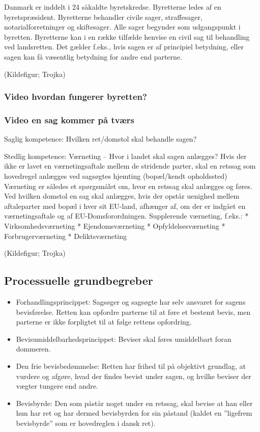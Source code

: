 \documentclass[]{book}
\providecommand{\tightlist}{%
  \setlength{\itemsep}{0pt}\setlength{\parskip}{0pt}}
\begin{document}
Danmark er inddelt i 24 såkaldte byretskredse.
Byretterne ledes af en byretspræsident.
Byretterne behandler civile sager, straffesager, notarialforretninger og skiftesager.
Alle sager begynder som udgangspunkt i byretten.
Byretterne kan i en række tilfælde henvise en civil sag til behandling ved landsretten. Det gælder f.eks., hvis sagen er af principiel betydning, eller sagen kan få væsentlig betydning for andre end parterne.

(Kildefigur; Trojka)

\hypertarget{video-hvordan-fungerer-byretten}{%
\subsubsection{Video hvordan fungerer byretten?}\label{video-hvordan-fungerer-byretten}}

\hypertarget{video-en-sag-kommer-pa-tvrs}{%
\subsubsection{Video en sag kommer på tværs}\label{video-en-sag-kommer-pa-tvrs}}

Saglig kompetence: Hvilken ret/domstol skal behandle sagen?

Stedlig kompetence: Værneting -- Hvor i landet skal sagen anlægges?
Hvis der ikke er lavet en værnetingsaftale mellem de stridende parter, skal en retssag som hovedregel anlægges ved sagsøgtes hjemting (bopæl/kendt opholdssted) Værneting er således et spørgsmålet om, hvor en retssag skal anlægges og føres. Ved hvilken domstol en sag skal anlægges, hvis der opstår uenighed mellem aftaleparter med bopæl i hver sit EU-land, afhænger af, om der er indgået en værnetingsaftale og af EU-Domsforordningen.
Supplerende værneting, f.eks.:
* Virksomhedsværneting
* Ejendomsværneting
* Opfyldelsesværneting
* Forbrugerværneting
* Deliktsværneting

(Kildefigur; Trojka)

\hypertarget{processuelle-grundbegreber}{%
\subsection{Processuelle grundbegreber}\label{processuelle-grundbegreber}}

\begin{itemize}
\tightlist
\item
  Forhandlingsprincippet: Sagsøger og sagsøgte har selv ansvaret for sagens bevisførelse. Retten kan opfordre parterne til at føre et bestemt bevis, men parterne er ikke forpligtet til at følge rettens opfordring.
\item
  Bevisumiddelbarhedsprincippet: Beviser skal føres umiddelbart foran dommeren.
\item
  Den frie bevisbedømmelse: Retten har frihed til på objektivt grundlag, at vurdere og afgøre, hvad der findes bevist under sagen, og hvilke beviser der vægter tungere end andre.
\item
  Bevisbyrde: Den som påstår noget under en retssag, skal bevise at han eller hun har ret og har dermed bevisbyrden for sin påstand (kaldet en ''ligefrem bevisbyrde'' som er hovedreglen i dansk ret).
\end{itemize}
\end{document}
